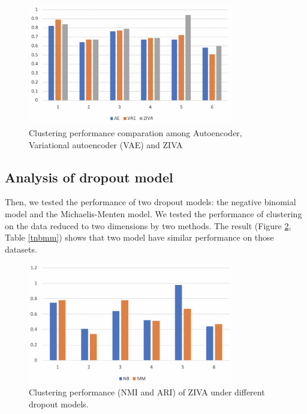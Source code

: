 \begin{figure}[htb!]
    \centering
    \includegraphics[width=0.8\textwidth]{figures/myfigures/3aeclu.png}
    \caption{Clustering performance comparation among Autoencoder, Variational autoencoder (VAE) and ZIVA}
    \label{3aeclu}
\end{figure}

\subsection{Analysis of dropout model}
Then, we tested the performance of two dropout models: the negative binomial model and the Michaelis-Menten model. We tested the performance of clustering on the data reduced to two dimensions by two methods. The result (Figure \ref{nbmmari}, Table \ref{tnbmm}) shows that two model have similar performance on those datasets.
\begin{figure}[htb!]
    \centering
    \includegraphics[width=0.8\textwidth]{figures/myfigures/nbmmari.png}
    \caption{Clustering performance (NMI and ARI) of ZIVA under different dropout models.}
    \label{nbmmari}
\end{figure}

